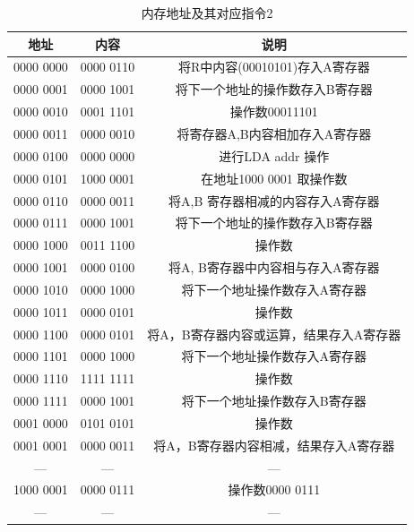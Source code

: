 \documentclass[UTF8]{ctexart}
\begin{document}
    \begin{table}[!htb]
      \centering
      \begin{tabular}{|c|c|c|}
        \hline
        地址 & 内容 & 说明 \\
        \hline
        0000 0000 & 0000 0110 & 将R中内容(00010101)存入A寄存器\\
        \hline
        0000 0001 & 0000 1001 & 将下一个地址的操作数存入B寄存器 \\
        0000 0010 & 0001 1101 & 操作数00011101 \\
        \hline
        0000 0011 & 0000 0010 & 将寄存器A,B内容相加存入A寄存器 \\
        \hline
        0000 0100 & 0000 0000 & 进行LDA addr 操作 \\
        0000 0101 & 1000 0001 & 在地址1000 0001 取操作数 \\
        \hline
        0000 0110 & 0000 0011 & 将A,B 寄存器相减的内容存入A寄存器 \\
        \hline
        0000 0111 & 0000 1001 & 将下一个地址的操作数存入B寄存器\\
        0000 1000 & 0011 1100 & 操作数\\
        \hline
        0000 1001 & 0000 0100 & 将A, B寄存器中内容相与存入A寄存器 \\
        \hline
        0000 1010 & 0000 1000 & 将下一个地址操作数存入A寄存器 \\
        0000 1011 & 0000 0101 & 操作数\\
        \hline
        0000 1100 & 0000 0101 & 将A，B寄存器内容或运算，结果存入A寄存器\\
        \hline
        0000 1101 & 0000 1000 & 将下一个地址操作数存入A寄存器\\
        0000 1110 & 1111 1111 & 操作数\\
        \hline
        0000 1111 & 0000 1001 & 将下一个地址操作数存入B寄存器\\
        0001 0000 & 0101 0101 & 操作数\\
        \hline
        0001 0001 & 0000 0011 & 将A，B寄存器内容相减，结果存入A寄存器\\
        \hline
        --- & --- & --- \\
        \hline
        1000 0001 & 0000 0111 & 操作数0000 0111\\
        \hline
        --- & ---  & --- \\
        \hline
      \end{tabular}
      \caption{内存地址及其对应指令2}\label{内存地址及其对应指令2}
    \end{table}
    \newpage
\end{document}
